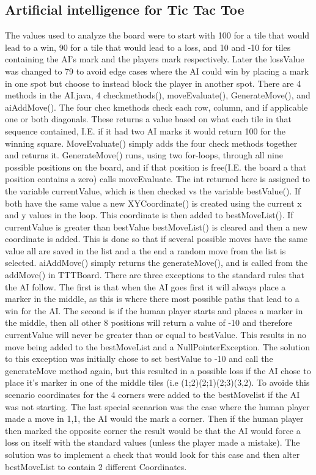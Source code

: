 \documentclass[a4paper,10pt]{article}
\begin{document}
	\subsection{Artificial intelligence for Tic Tac Toe}
	The values used to analyze the board were to start with 100 for a tile that would lead to a win, 90 for a tile that would lead to a loss, and 10 and -10 for tiles containing the AI’s mark and the players mark respectively. Later the lossValue was changed to 79 to avoid edge cases where the AI could win by placing a mark in one spot but choose to instead block the player in another spot.
	There are 4 methods in the AI.java, 4 checkmethods(), moveEvaluate(), GenerateMove(), and aiAddMove().
	The four chec kmethods check each row, column, and if applicable one or both diagonals. These returns a value based on what each tile in that sequence contained, I.E. if it had two AI marks it would return 100 for the winning square.
	MoveEvaluate() simply adds the four check methods together and returns it.
	GenerateMove() runs, using two for-loops, through all nine possible positions on the board, and if that position is free(I.E. the board a that position contains a zero) calls moveEvaluate. The int returned here is assigned to the variable currentValue, which is then checked vs the variable bestValue(). If both have the same value a new XYCoordinate() is created using the current x and y values in the loop. This coordinate is then added to bestMoveList(). If currentValue is greater than bestValue bestMoveList() is cleared and then a new coordinate is added. This is done so that if several possible moves have the same value all are saved in the list and a the end a random move from the list is selected.
	aiAddMove() simply returns the generateMove(), and is called from the addMove() in TTTBoard.
	There are three exceptions to the standard rules that the AI follow.
	The first is that when the AI goes first it will always place a marker in the middle, as this is where there most possible paths that lead to a win for the AI.
	The second is if the human player starts and places a marker in the middle, then all other 8 positions will return a value of -10 and therefore currentValue will never be greater than or equal to bestValue. This results in no move being added to the bestMoveList and a NullPointerException. The solution to this exception was initially chose to set bestValue to -10 and call the generateMove method again, but this resulted in a possible loss if the AI chose to place it’s marker in one of the middle tiles (i.e (1;2)(2;1)(2;3)(3,2). To avoide this scenario coordinates for the 4 corners were added to the bestMovelist if the AI was not starting.
	The last special scenarion was the case where the human player made a move in 1,1, the AI would the mark a corner. Then if the human player then marked the opposite corner the result would be that the AI would force a loss on itself with the standard values (unless the player made a mistake). The solution was to implement a check that would look for this case and then alter bestMoveList to contain 2 different Coordinates.
	
\end{document}
